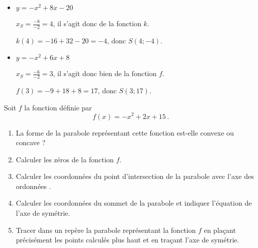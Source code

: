 \begin{exo}[title=sans calculatrice]
\begin{sol*}
\begin{itemize}
\item $y=-x^2+8x-20$

$x_S = \frac{-8}{-2} =4$, il s'agit donc de la fonction $k$.

$k(4)=-16+32-20 = -4$, donc $S(4;-4)$.


\item $y=-x^2+6x+8$

$x_S = \frac{-6}{-2} =3$, il s'agit donc bien de la fonction $f$.

$f(3)=-9+18+8 = 17$, donc $S(3;17)$.


\end{itemize}
\end{sol*}



\end{exo}




\begin{exo}[title=Sans calculatrice]

Soit $f$ la fonction définie par $$f(x) = -x^2+2x+15 \,.$$

\begin{enumerate}
\item La forme de la parabole représentant cette fonction est-elle convexe ou concave ?

\item Calculer les zéros de la fonction $f$.

\item Calculer les coordonnées du point d'intersection de la parabole avec l'axe des ordonnées .

\item Calculer les coordonnées du sommet de la parabole et indiquer l'équation de l'axe de symétrie.

\item Tracer dans un repère la parabole représentant la fonction $f$ en plaçant précisément les points calculés plus haut et en traçant l'axe de symétrie. 
\end{enumerate}
\end{exo}









